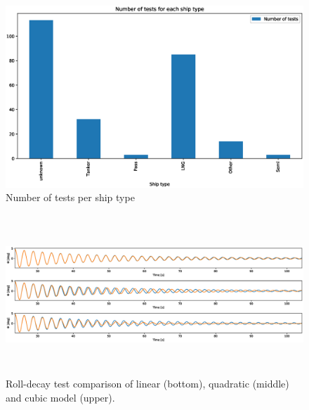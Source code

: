 \begin{figure}[H]
    \centering
    \includegraphics[width=0.5\columnwidth]{figures/ship_types.eps}
    \caption{Number of tests per ship type}
    \label{fig:ship_types}
\end{figure}

\begin{figure}[H]
    \centering
    \includegraphics[width=12cm, height = 6cm ]{figures/roll_decay_model_compare.eps}
        \vspace{-0.5cm}
    \caption{Roll-decay test comparison of linear (bottom), quadratic (middle) and cubic model (upper).}
    \label{fig:roll_decay_model_compare}
\end{figure}